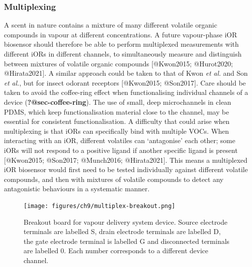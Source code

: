 \documentclass[
  letterpaper,
  DIV=11,
  numbers=noendperiod]{scrartcl}
\begin{document}
\hypertarget{multiplexing}{%
\subsubsection{Multiplexing}\label{multiplexing}}

A scent in nature contains a mixture of many different volatile organic
compounds in vapour at different concentrations. A future vapour-phase
iOR biosensor should therefore be able to perform multiplexed
measurements with different iORs in different channels, to
simultaneously measure and distinguish between mixtures of volatile
organic compounds {[}@Kwon2015; @Hurot2020; @Hirata2021{]}. A similar
approach could be taken to that of Kwon \emph{et al.} and Son \emph{et
al.}, but for insect odorant receptors {[}@Kwon2015; @Son2017{]}. Care
should be taken to avoid the coffee-ring effect when functionalising
individual channels of a device (\textbf{?@sec-coffee-ring}). The use of
small, deep microchannels in clean PDMS, which keep functionalisation
material close to the channel, may be essential for consistent
functionalisation. A difficulty that could arise when multiplexing is
that iORs can specifically bind with multiple VOCs. When interacting
with an iOR, different volatiles can `antagonise' each other; some iORs
will not respond to a positive ligand if another specific ligand is
present {[}@Kwon2015; @Son2017; @Munch2016; @Hirata2021{]}. This means a
multiplexed iOR biosensor would first need to be tested individually
against different volatile compounds, and then with mixtures of volatile
compounds to detect any antagonistic behaviours in a systematic manner.

\begin{figure}

{\centering \texttt{[image: figures/ch9/multiplex-breakout.png]}

}

\caption{\label{fig-vapour-sensor-breakout}Breakout board for vapour
delivery system device. Source electrode terminals are labelled S, drain
electrode terminals are labelled D, the gate electrode terminal is
labelled G and disconnected terminals are labelled 0. Each number
corresponds to a different device channel.}

\end{figure}
\end{document}
